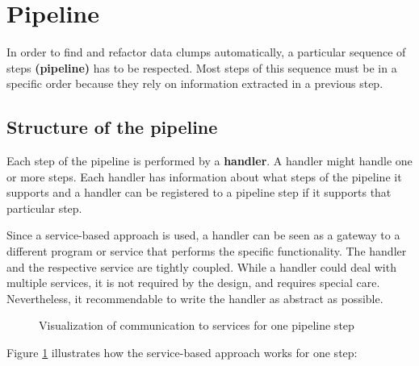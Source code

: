 

\section{Pipeline}\label{sec:pipeline}
In order to find and refactor data clumps automatically, a particular sequence of steps \textbf{(pipeline)} has to be respected. Most steps of this sequence must be in a specific order because they rely on information extracted in a previous step.

\subsection{Structure of the pipeline}
Each step of the pipeline is performed by a  \textbf{handler}. A handler might handle one or more steps.  Each handler has information about what steps of the pipeline it supports and  a handler can be registered to a pipeline step if it supports that particular step.  

Since a service-based approach is used, a handler can be seen as a gateway to a different program or service that performs the specific functionality.  The handler and the respective service are tightly coupled. While a handler could deal with multiple services, it is not required by the design, and requires special care. Nevertheless, it recommendable to write the handler as abstract as possible.
\begin{figure}[ht!]
    \centering
    
    \caption{Visualization of communication to services for one pipeline step}
    \label{fig:solver_gateway_service_overview}
\end{figure}

Figure \ref{fig:solver_gateway_service_overview} illustrates how the service-based approach works for one step:

